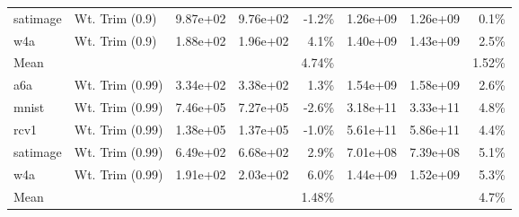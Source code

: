 \begin{table}[ht]
\begin{center}
\begin{small}
\begin{sc}
\begin{tabular}{llccrccr}
satimage & Wt. Trim (0.9) & 9.87e+02 & 9.76e+02 & -1.2\%  & 1.26e+09 & 1.26e+09 & 0.1\%  \\
w4a & Wt. Trim (0.9) & 1.88e+02 & 1.96e+02 & 4.1\% & 1.40e+09 & 1.43e+09 & 2.5\% \\
\midrule
Mean &  & &  & 4.74\% & & & 1.52\% \\
\midrule
a6a & Wt. Trim (0.99) & 3.34e+02 & 3.38e+02 & 1.3\%  & 1.54e+09 & 1.58e+09 & 2.6\%  \\
mnist & Wt. Trim (0.99) & 7.46e+05 & 7.27e+05 & -2.6\% & 3.18e+11 & 3.33e+11 & 4.8\% \\
rcv1 & Wt. Trim (0.99) & 1.38e+05 & 1.37e+05 & -1.0\% & 5.61e+11 & 5.86e+11 & 4.4\% \\
satimage & Wt. Trim (0.99) & 6.49e+02 & 6.68e+02 & 2.9\%  & 7.01e+08 & 7.39e+08 & 5.1\%  \\
w4a & Wt. Trim (0.99) & 1.91e+02 & 2.03e+02 & 6.0\% & 1.44e+09 & 1.52e+09 & 5.3\% \\
\midrule
Mean &  & &  & 1.48\% & & & 4.7\% \\
\bottomrule
\end{tabular}
\end{sc}
\end{small}
\end{center}
\vskip -0.1in
\end{table}


